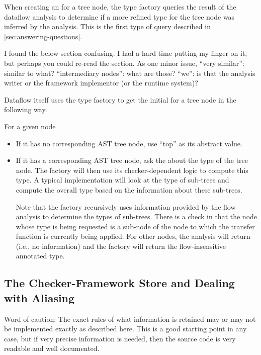When creating an  for a tree node, the type factory
queries the result of the dataflow analysis to determine if a more refined
type for the tree node was inferred by the analysis. This is the first
type of query described in \autoref{sec:answering-questions}.

\begin{workinprogress}
I found the below section confusing.  I had a hard time putting my finger
on it, but perhaps you could re-read the section.  As one minor issue,
``very similar'':  similar to what?  ``intermediary nodes'':  what are
those?  ``we'':  is that the analysis writer or the framework implementor
(or the runtime system)?
\end{workinprogress}

Dataflow itself uses the type factory to get the initial
 for a tree node in the following way.

For a given node 
\begin{itemize}
\item
    If it has no corresponding AST tree node, use ``top'' as its
    abstract value.
\item
    If it has a corresponding AST tree node, ask the
     about the type of the tree node.  The
    factory will then use its checker-dependent logic to compute this
    type.  A typical implementation will look at the type of sub-trees
    and compute the overall type based on the information about these
    sub-trees.

    Note that the factory recursively uses information provided by the
    flow analysis to determine the types of sub-trees.  There is a
    check in  that the node whose type is
    being requested is a sub-node of the node to which the transfer
    function is currently being applied.  For other nodes, the
    analysis will return  (i.e., no information) and the
    factory will return the flow-insensitive annotated type.

\end{itemize}



\subsection{The Checker-Framework Store and Dealing with Aliasing}

\begin{workinprogress}
    Word of caution: The exact rules of what information is
        retained may or may not be implemented exactly as described
        here.  This is a good starting point in any case, but if very
        precise information is needed, then the source code is very
        readable and well documented.
\end{workinprogress}

